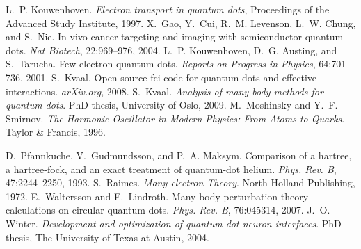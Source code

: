 \documentclass[xcolor=pdftex,hyperref={pdfpagelabels=false},table]{beamer}
\begin{document}
\begin{frame}
\begin{small}
 {\scriptsize
\beamertemplatebookbibitems
\begin{thebibliography}{10}
L.~P. Kouwenhoven.
{\em Electron transport in quantum dots}, Proceedings of the Advanced Study
  Institute, 1997.
 X.~Gao, Y.~Cui, R.~M. Levenson, L.~W. Chung, and S.~Nie.
 In vivo cancer targeting and imaging with semiconductor quantum dots.
 {\em Nat Biotech}, 22:969--976, 2004.
L.~P. Kouwenhoven, D.~G. Austing, and S.~Tarucha.
 Few-electron quantum dots.
 {\em Reports on Progress in Physics}, 64:701--736, 2001.
S.~Kvaal.
 Open source fci code for quantum dots and effective interactions.
 {\em arXiv.org}, 2008.
S.~Kvaal.
{\em Analysis of many-body methods for quantum dots}.
PhD thesis, University of Oslo, 2009.
M.~Moshinsky and Y.~F. Smirnov.
 {\em The Harmonic Oscillator in Modern Physics: From Atoms to
  Quarks}.
 Taylor \& Francis, 1996.
\end{thebibliography}
%
}
 \end{small}
\end{frame}

\begin{frame}
\begin{small}
 {\scriptsize
\beamertemplatebookbibitems
\begin{thebibliography}{10}
D.~Pfannkuche, V.~Gudmundsson, and P.~A. Maksym.
 Comparison of a hartree, a hartree-fock, and an exact treatment of
  quantum-dot helium.
 {\em Phys. Rev. B}, 47:2244--2250, 1993.
S.~Raimes.
 {\em Many-electron Theory}.
 North-Holland Publishing, 1972.
E.~Waltersson and E.~Lindroth.
 Many-body perturbation theory calculations on circular quantum dots.
 {\em Phys. Rev. B}, 76:045314, 2007.
J.~O. Winter.
 {\em Development and optimization of quantum dot-neuron interfaces}.
 PhD thesis, The University of Texas at Austin, 2004.
\end{thebibliography}
%
}
 \end{small}
\end{frame}
\end{document}
